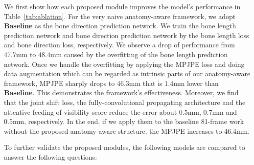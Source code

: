 \documentclass[journal]{IEEEtran}
\begin{document}
We first show how each proposed module improves the model's performance in Table~\ref{tab:ablation}. For the very naive anatomy-aware framework, we adopt \textbf{Baseline} as the bone direction prediction network. We train the bone length prediction network and bone direction prediction network by the bone length loss and bone direction loss, respectively. We observe a drop of performance from 47.7mm to 48.4mm caused by the overfitting of the bone length prediction network. Once we handle the overfitting by applying the MPJPE loss and doing data augmentation which can be regarded as intrinsic parts of our anatomy-aware framework, MPJPE sharply drops to 46.3mm that is 1.4mm lower than \textbf{Baseline}. This demonstrates the framework's effectiveness. Moreover, we find that the joint shift loss, the fully-convolutional propagating architecture and the attentive feeding of visibility score reduce the error about 0.5mm, 0.7mm and 0.5mm, respectively. In the end, if we apply them to the baseline 81-frame work without the proposed anatomy-aware structure, the MPJPE increases to 46.4mm.

To further validate the proposed modules, the following models are compared to answer the following questions:
\end{document}
